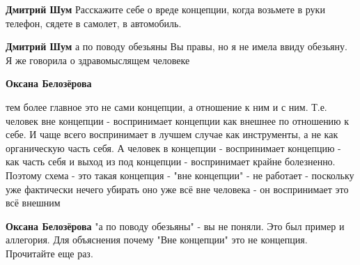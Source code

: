 \begin{itemize}
\begin{itemize}
 
\textbf{Дмитрий Шум} Расскажите себе о вреде концепции, когда возьмете в руки телефон, сядете в самолет, в автомобиль.

 
\textbf{Дмитрий Шум} а по поводу обезьяны Вы правы, но я не имела ввиду обезьяну. Я же говорила о здравомыслящем человеке


 
\textbf{Оксана Белозёрова} 

тем более главное это не сами концепции, а отношение
к ним и с ним. Т.е. человек вне концепции - воспринимает концепции как внешнее
по отношению к себе. И чаще всего воспринимает в лучшем случае как инструменты,
а не как органическую часть себя. А человек в концепции - воспринимает
концепцию - как часть себя и выход из под концепции - воспринимает крайне
болезненно. Поэтому схема - это такая концепция - "вне концепции" - не работает
- поскольку уже фактически нечего убирать оно уже всё вне человека - он
воспринимает это всё внешним

 
\textbf{Оксана Белозёрова} "а по поводу обезьяны" - вы не поняли. Это был пример и аллегория. Для объяснения почему "Вне концепции" это не концепция. Прочитайте еще раз.

 

\end{itemize}
\end{itemize}
